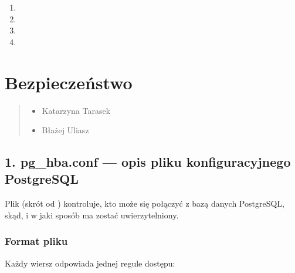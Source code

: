 \documentclass[letterpaper,10pt,polish]{sphinxmanual}
\begin{document}
\begin{enumerate}
\item {} 
\sphinxAtStartPar
{}

\item {} 
\sphinxAtStartPar
{}

\item {} 
\sphinxAtStartPar
{}

\item {} 
\sphinxAtStartPar
{}

\end{enumerate}

\sphinxstepscope


\section{Bezpieczeństwo}
\label{\detokenize{rozdzial2/bezpieczenstwo/index:bezpieczenstwo}}\label{\detokenize{rozdzial2/bezpieczenstwo/index::doc}}\begin{quote}\begin{description}
\begin{itemize}
\item {} 
\sphinxAtStartPar
Katarzyna Tarasek

\item {} 
\sphinxAtStartPar
Błażej Uliasz

\end{itemize}

\end{description}\end{quote}


\subsection{1. pg\_hba.conf — opis pliku konfiguracyjnego PostgreSQL}
\label{\detokenize{rozdzial2/bezpieczenstwo/index:pg-hba-conf-opis-pliku-konfiguracyjnego-postgresql}}
\sphinxAtStartPar
Plik  (skrót od ) kontroluje, kto może się połączyć z bazą danych PostgreSQL, skąd, i w jaki sposób ma zostać uwierzytelniony.


\subsubsection{Format pliku}
\label{\detokenize{rozdzial2/bezpieczenstwo/index:format-pliku}}
\sphinxAtStartPar
Każdy wiersz odpowiada jednej regule dostępu:
\end{document}
